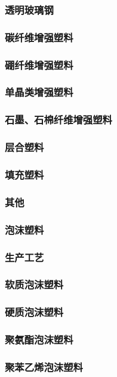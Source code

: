 \documentclass[UTF8]{../../ApplicationUniverse}
\begin{document}
        \subsubsection{透明玻璃钢}
    \subsubsection{碳纤维增强塑料}
    \subsubsection{硼纤维增强塑料}
    \subsubsection{单晶类增强塑料}
    \subsubsection{石墨、石棉纤维增强塑料}
    \subsubsection{层合塑料}
    \subsubsection{填充塑料}
    \subsubsection{其他}
\subsubsection{泡沫塑料}
    \subsubsection{生产工艺}
    \subsubsection{软质泡沫塑料}
    \subsubsection{硬质泡沫塑料}
    \subsubsection{聚氨酯泡沫塑料}
    \subsubsection{聚苯乙烯泡沫塑料}
\end{document}
